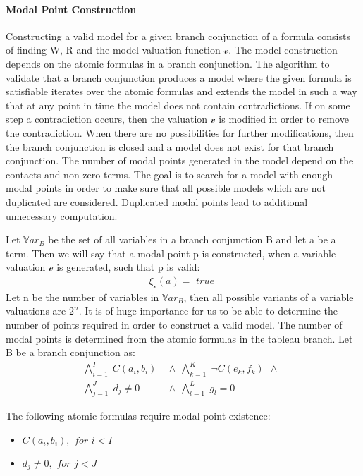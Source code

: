 \documentclass{article}
\newcommand{\curvedE}{\mathscr{e}}
\newcommand{\Var}{\mathbb{V}ar}
\newcommand{\vE}{\mathscr{v}}
\newcommand{\vBool}{\xi}
\newcommand{\BranchConjunction}{%
\begin{align*}
			\bigwedge_{i=1}^{I} \; C(a_i, b_i) \:\: & \wedge \:\: 
			\bigwedge_{k=1}^{K} \; \neg C(e_k, f_k) \:\: \wedge \:\: \\
			\bigwedge_{j=1}^{J} \; d_j \neq 0 \:\: & \wedge \:\:
			\bigwedge_{l=1}^{L} \; g_l = 0 \:\:
\end{align*}%
}
\begin{document}
	\paragraph{Modal Point Construction}
		Constructing a valid model for a given branch conjunction of a formula consists of finding W, R and the model valuation function $\vE$.
		The model construction depends on the atomic formulas in a branch conjunction. 
		The algorithm to validate that a branch conjunction produces a model where the given formula is satisfiable iterates over the atomic formulas and extends the model in such a way that at any point in time the model does not contain contradictions.
		If on some step a contradiction occurs, then the valuation $\vE$ is modified in order to remove the contradiction.
		When there are no possibilities for further modifications, then the branch conjunction is closed and a model does not exist for that branch conjunction.
		The number of modal points generated in the model depend on the contacts and non zero terms.
		The goal is to search for a model with enough modal points in order to make sure that all possible models which are not duplicated are considered.
		Duplicated modal points lead to additional unnecessary computation. 
		\newline

		Let $\Var_B$ be the set of all variables in a branch conjunction B and let a be a term.
		Then we will say that a modal point p is constructed, when a variable valuation $\curvedE$ is generated, such that p is valid:
		\begin{align*}
			\vBool_{\curvedE}(a) = \textit{ true }
		\end{align*}
		Let n be the number of variables in $\Var_B$, then all possible variants of a variable valuations are $2^n$.
		It is of huge importance for us to be able to determine the number of points required in order to construct a valid model. The number of modal points is determined from the atomic formulas in the tableau branch. Let B be a branch conjunction as:
		\BranchConjunction
		The following atomic formulas require modal point existence:
		\begin{itemize}
			\item $C(a_i, b_i), \textit{ for } i < I$
			\item $d_j \neq 0, \textit{ for } j < J$
		\end{itemize}
\end{document}
